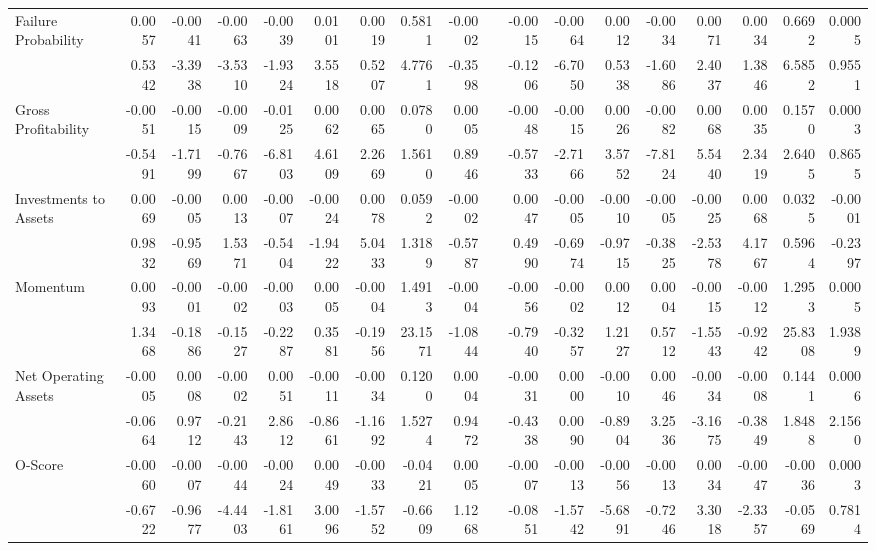 \begin{table}[h]
{\begin{tabular}{lrrrrrrrrrrrrrrrrr}
      Failure Probability & 0.0057 & -0.0041 & -0.0063 & -0.0039 & 0.0101 & 0.0019 & 0.5811 & -0.0002 &       & -0.0015 & -0.0064 & 0.0012 & -0.0034 & 0.0071 & 0.0034 & 0.6692 & 0.0005 \\
            & 0.5342 & -3.3938 & -3.5310 & -1.9324 & 3.5518 & 0.5207 & 4.7761 & -0.3598 &       & -0.1206 & -6.7050 & 0.5338 & -1.6086 & 2.4037 & 1.3846 & 6.5852 & 0.9551 \\
      Gross Profitability & -0.0051 & -0.0015 & -0.0009 & -0.0125 & 0.0062 & 0.0065 & 0.0780 & 0.0005 &       & -0.0048 & -0.0015 & 0.0026 & -0.0082 & 0.0068 & 0.0035 & 0.1570 & 0.0003 \\
            & -0.5491 & -1.7199 & -0.7667 & -6.8103 & 4.6109 & 2.2669 & 1.5610 & 0.8946 &       & -0.5733 & -2.7166 & 3.5752 & -7.8124 & 5.5440 & 2.3419 & 2.6405 & 0.8655 \\
      Investments to Assets & 0.0069 & -0.0005 & 0.0013 & -0.0007 & -0.0024 & 0.0078 & 0.0592 & -0.0002 &       & 0.0047 & -0.0005 & -0.0010 & -0.0005 & -0.0025 & 0.0068 & 0.0325 & -0.0001 \\
            & 0.9832 & -0.9569 & 1.5371 & -0.5404 & -1.9422 & 5.0433 & 1.3189 & -0.5787 &       & 0.4990 & -0.6974 & -0.9715 & -0.3825 & -2.5378 & 4.1767 & 0.5964 & -0.2397 \\
      Momentum & 0.0093 & -0.0001 & -0.0002 & -0.0003 & 0.0005 & -0.0004 & 1.4913 & -0.0004 &       & -0.0056 & -0.0002 & 0.0012 & 0.0004 & -0.0015 & -0.0012 & 1.2953 & 0.0005 \\
            & 1.3468 & -0.1886 & -0.1527 & -0.2287 & 0.3581 & -0.1956 & 23.1571 & -1.0844 &       & -0.7940 & -0.3257 & 1.2127 & 0.5712 & -1.5543 & -0.9242 & 25.8308 & 1.9389 \\
      Net Operating Assets & -0.0005 & 0.0008 & -0.0002 & 0.0051 & -0.0011 & -0.0034 & 0.1200 & 0.0004 &       & -0.0031 & 0.0000 & -0.0010 & 0.0046 & -0.0034 & -0.0008 & 0.1441 & 0.0006 \\
            & -0.0664 & 0.9712 & -0.2143 & 2.8612 & -0.8661 & -1.1692 & 1.5274 & 0.9472 &       & -0.4338 & 0.0090 & -0.8904 & 3.2536 & -3.1675 & -0.3849 & 1.8488 & 2.1560 \\
      O-Score & -0.0060 & -0.0007 & -0.0044 & -0.0024 & 0.0049 & -0.0033 & -0.0421 & 0.0005 &       & -0.0007 & -0.0013 & -0.0056 & -0.0013 & 0.0034 & -0.0047 & -0.0036 & 0.0003 \\
            & -0.6722 & -0.9677 & -4.4403 & -1.8161 & 3.0096 & -1.5752 & -0.6609 & 1.1268 &       & -0.0851 & -1.5742 & -5.6891 & -0.7246 & 3.3018 & -2.3357 & -0.0569 & 0.7814 \\

\end{tabular}}
\end{table}
